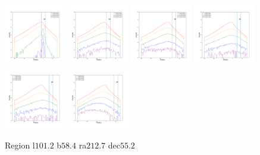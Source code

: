 \documentclass[12pt,prd]{article}
\begin{document}
\begin{figure}[h!]
\includegraphics[width=0.24\textwidth]{../figures/scanning_plotsgaiascan_l101_2_b58_4_ra212_7_dec55_2_npy_12.pdf}
\includegraphics[width=0.24\textwidth]{../figures/scanning_plotsgaiascan_l101_2_b58_4_ra212_7_dec55_2_npy_13.pdf}
\includegraphics[width=0.24\textwidth]{../figures/scanning_plotsgaiascan_l101_2_b58_4_ra212_7_dec55_2_npy_14.pdf}
\includegraphics[width=0.24\textwidth]{../figures/scanning_plotsgaiascan_l101_2_b58_4_ra212_7_dec55_2_npy_15.pdf}
\includegraphics[width=0.24\textwidth]{../figures/scanning_plotsgaiascan_l101_2_b58_4_ra212_7_dec55_2_npy_16.pdf}
\includegraphics[width=0.24\textwidth]{../figures/scanning_plotsgaiascan_l101_2_b58_4_ra212_7_dec55_2_npy_17.pdf}
\caption{Region l$101.2$ b$58.4$ ra$212.7$ dec$55.2$}
\end{figure}
\end{document}
